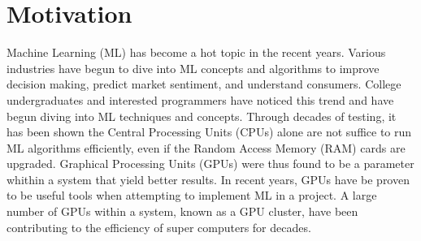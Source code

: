 \section*{Motivation}
\label{sec:Motivation}

Machine Learning (ML) has become a hot topic in the recent years. 
Various industries have begun to dive into ML concepts and algorithms  
to improve decision making, predict market sentiment, and understand consumers. 
College undergraduates and interested programmers have noticed this trend and have begun diving 
into ML techniques and concepts. Through decades of testing, it has been shown the 
Central Processing Units (CPUs) alone are not suffice to run ML algorithms efficiently, 
even if the Random Access Memory (RAM) cards are upgraded. Graphical Processing Units (GPUs) 
were thus found to be a parameter whithin a system that yield better results. 
In recent years, GPUs have be proven to be useful tools when attempting to implement ML in a project. 
A large number of GPUs within a system, known as a GPU cluster, have been contributing to the efficiency 
of super computers for decades. 
